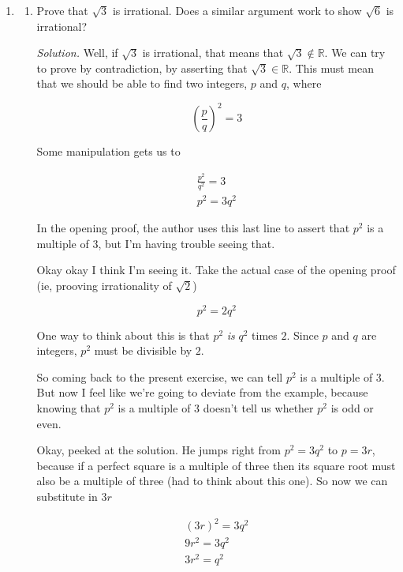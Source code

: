 \documentclass{article}
\numberwithin{equation}{subsection}
\numberwithin{theo}{subsection}
\begin{document}
\begin{enumerate}
    \item 
        \begin{enumerate}
            \item Prove that $\sqrt{3}$ is irrational. Does a similar argument
                work to show $\sqrt{6}$ is irrational?
            
\emph{Solution.} Well, if $\sqrt{3}$ is irrational, that means that $\sqrt{3}
\notin \mathbb{R}$. We can try to prove by contradiction, by asserting that
$\sqrt{3} \in \mathbb{R}$. This must mean that we should be able to find two
integers, $p$ and $q$, where

\begin{equation*}
    \left(\frac{p}{q}\right)^2 = 3
\end{equation*}

Some manipulation gets us to

\begin{align*}
    \frac{p^2}{q^2} = 3\\
    p^2 = 3q^2
\end{align*}

In the opening proof, the author uses this last line to assert that $p^2$ is a
multiple of $3$, but I'm having trouble seeing that.

Okay okay I think I'm seeing it. Take the actual case of the opening proof (ie,
prooving irrationality of $\sqrt{2}$)


\begin{equation*}
    p^2 = 2q^2
\end{equation*}

One way to think about this is that $p^2$ \emph{is} $q^2$ times $2$. Since $p$
and $q$ are integers, $p^2$ must be divisible by $2$.

So coming back to the present exercise, we can tell $p^2$ is a multiple of $3$.
But now I feel like we're going to deviate from the example, because knowing
that $p^2$ is a multiple of $3$ doesn't tell us whether $p^2$ is odd or even.

Okay, peeked at the solution. He jumps right from $p^2 = 3q^2$ to $p = 3r$,
because if a perfect square is a multiple of three then its square root must
also be a multiple of three (had to think about this one). So now we can
substitute in $3r$

\begin{align*}
    (3r)^2 = 3q^2\\
    9r^2 = 3q^2\\
    3r^2 = q^2
\end{align*}


\end{enumerate}
\end{enumerate}
\end{document}

